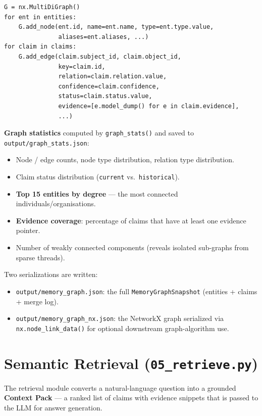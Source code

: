 \documentclass[12pt,a4paper]{article}
\begin{document}
\begin{lstlisting}[caption=Graph construction core (04\_graph.py)]
G = nx.MultiDiGraph()
for ent in entities:
    G.add_node(ent.id, name=ent.name, type=ent.type.value,
               aliases=ent.aliases, ...)
for claim in claims:
    G.add_edge(claim.subject_id, claim.object_id,
               key=claim.id,
               relation=claim.relation.value,
               confidence=claim.confidence,
               status=claim.status.value,
               evidence=[e.model_dump() for e in claim.evidence],
               ...)
\end{lstlisting}

\textbf{Graph statistics} computed by \texttt{graph\_stats()} and saved to \texttt{output/graph\_stats.json}:

\begin{itemize}
    \item Node / edge counts, node type distribution, relation type distribution.
    \item Claim status distribution (\texttt{current} vs.\ \texttt{historical}).
    \item \textbf{Top 15 entities by degree} — the most connected individuals/organisations.
    \item \textbf{Evidence coverage}: percentage of claims that have at least one evidence pointer.
    \item Number of weakly connected components (reveals isolated sub-graphs from sparse threads).
\end{itemize}

Two serializations are written:
\begin{itemize}
    \item \texttt{output/memory\_graph.json}: the full \texttt{MemoryGraphSnapshot} (entities + claims + merge log).
    \item \texttt{output/memory\_graph\_nx.json}: the NetworkX graph serialized via \texttt{nx.node\_link\_data()} for optional downstream graph-algorithm use.
\end{itemize}

\section{Semantic Retrieval (\texttt{05\_retrieve.py})}

The retrieval module converts a natural-language question into a grounded \textbf{Context Pack} — a ranked list of claims with evidence snippets that is passed to the LLM for answer generation.
\end{document}
